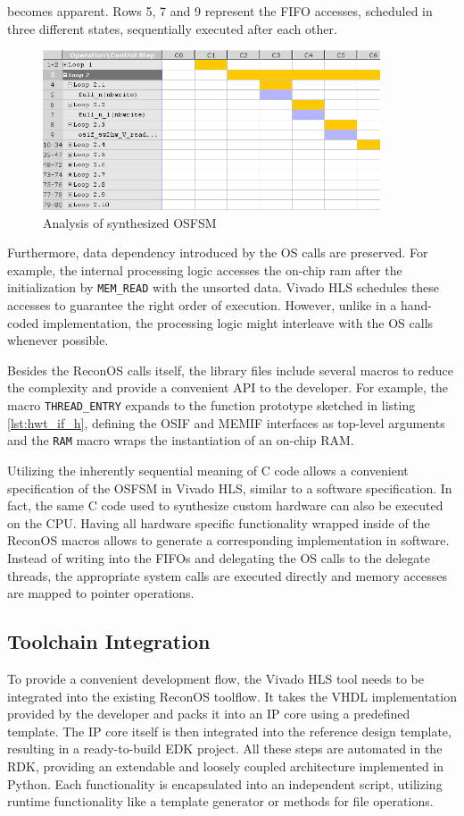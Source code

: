 becomes apparent. Rows 5, 7 and 9 represent the \ac{FIFO} accesses, scheduled
in three different states, sequentially executed after each other.
\begin{figure}[tb]
	\centering
	\includegraphics[width=10cm]{../figures/osfsm_a}
	\caption{Analysis of synthesized \acs{OSFSM}}
	\label{fig:osfsm_a}
\end{figure}
Furthermore, data dependency introduced by the \ac{OS} calls are preserved.
For example, the internal processing logic accesses the on-chip ram after the
initialization by \lstinline{MEM_READ} with the unsorted data. Vivado HLS
schedules these accesses to guarantee the right order of execution. However,
unlike in a hand-coded implementation, the processing logic might interleave
with the \ac{OS} calls whenever possible.

Besides the ReconOS calls itself, the library files include several macros to
reduce the complexity and provide a convenient \ac{API} to the developer. For
example, the macro \lstinline{THREAD_ENTRY} expands to the function prototype
sketched in listing \ref{lst:hwt_if_h}, defining the \ac{OSIF} and \ac{MEMIF}
interfaces as top-level arguments and the \lstinline{RAM} macro wraps the
instantiation of an on-chip \ac{RAM}.

Utilizing the inherently sequential meaning of C code allows a convenient
specification of the \ac{OSFSM} in Vivado HLS, similar to a software
specification. In fact, the same C code used to synthesize custom hardware can
also be executed on the \ac{CPU}. Having all hardware specific functionality
wrapped inside of the ReconOS macros allows to generate a corresponding
implementation in software. Instead of writing into the
\acp{FIFO} and delegating the \ac{OS} calls to the delegate threads, the
appropriate system calls are executed directly and memory accesses are mapped
to pointer operations.

\subsection{Toolchain Integration}
To provide a convenient development flow, the Vivado HLS tool needs to be
integrated into the existing ReconOS toolflow. It takes the \ac{VHDL}
implementation provided by the developer and packs it into an \ac{IP} core
using a predefined template. The \ac{IP} core itself is then integrated into
the reference design template, resulting in a ready-to-build EDK project. All
these steps are automated in the \ac{RDK}, providing an extendable and loosely
coupled architecture implemented in Python. Each functionality is encapsulated
into an independent script, utilizing runtime functionality like a template
generator or methods for file operations.

